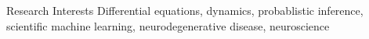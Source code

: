 \begin{rSection}{Research Interests}
Differential equations, dynamics, probablistic inference, scientific machine learning, neurodegenerative disease, neuroscience
\end{rSection}